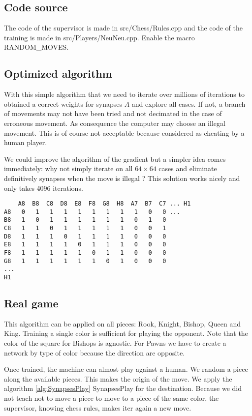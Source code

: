 \documentclass[a4paper,10pt]{article}
\begin{document}
\subsection{Code source}

The code of the supervisor is made in src/Chess/Rules.cpp and the code of the
training is made in src/Players/NeuNeu.cpp. Enable the macro RANDOM\_MOVES.

\subsection{Optimized algorithm}

With this simple algorithm that we need to iterate over millions of iterations
to obtained a correct weights for synapses $A$ and explore all cases. If not, a
branch of movements may not have been tried and not decimated in the case of
erroneous movement. As consequence the computer may choose an illegal
movement. This is of course not acceptable because considered as cheating by a
human player.

We could improve the algorithm of the gradient but a simpler idea comes
immediately: why not simply iterate on all $64 \times 64$ cases and eliminate
definitively synapses when the move is illegal ? This solution works nicely and
only takes 4096 iterations.

\begin{verbatim}
    A8  B8  C8  D8  E8  F8  G8  H8  A7  B7  C7 ... H1
A8   0   1   1   1   1   1   1   1   1   0   0 ...
B8   1   0   1   1   1   1   1   1   0   1   0
C8   1   1   0   1   1   1   1   1   0   0   1
D8   1   1   1   0   1   1   1   1   0   0   0
E8   1   1   1   1   0   1   1   1   0   0   0
F8   1   1   1   1   1   0   1   1   0   0   0
G8   1   1   1   1   1   1   0   1   0   0   0
...
H1
\end{verbatim}

\subsection{Real game}

This algorithm can be applied on all pieces: Rook, Knight, Bishop, Queen and
King. Training a single color is sufficient for playing the opponent. Note that
the color of the square for Bishops is agnostic. For Pawns we have to create a
network by type of color because the direction are opposite.

Once trained, the machine can almost play against a human. We random a piece
along the available pieces. This makes the origin of the move. We apply the
algorithm \ref{alg:SynapsesPlay} SynapsesPlay for the destination. Because we
did not teach not to move a piece to move to a piece of the same color, the
supervisor, knowing chess rules, makes iter again a new move.
\end{document}
